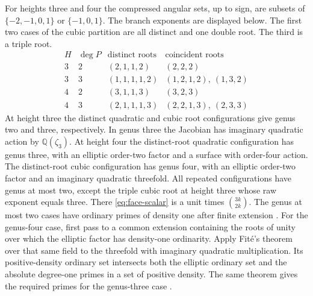 For heights three and four the compressed angular sets, up to sign, are
subsets of \(\{-2,-1,0,1\}\) or \(\{-1,0,1\}\). The branch exponents
are displayed below. The first two cases of the cubic partition are
all distinct and one double root. The third is a triple root.
\[
\begin{array}{c|c|c|c}
H & \deg P & \text{distinct roots} & \text{coincident roots}\\ \hline
3 & 2 &(2,1,1,2)&(2,2,2)\\
3 & 3 &(1,1,1,1,2)&(1,2,1,2),\ (1,3,2)\\
4 & 2 &(3,1,1,3)&(3,2,3)\\
4 & 3 &(2,1,1,1,3)&(2,2,1,3),\ (2,3,3)
\end{array}
\]
At height three the distinct quadratic and cubic root configurations
give genus two and three, respectively. In genus three the Jacobian has imaginary quadratic action
by \(\mathbb Q(\zeta_3)\). At height four the distinct-root quadratic
configuration has genus three, with an elliptic order-two factor and a
surface with order-four action. The distinct-root cubic configuration
has genus four, with an elliptic order-two factor and an imaginary
quadratic threefold. All repeated configurations have genus at most two,
except the triple cubic root at height three whose raw exponent equals
three. There \eqref{eq:face-scalar} is a unit times \(\binom{3k}{2k}\).
The genus at most two cases have ordinary primes of density one after
finite extension \cite{sawin}. For the genus-four case, first pass to a
common extension containing the roots of unity over which the elliptic
factor has density-one ordinarity. Apply Fit\'e's theorem over that same
field to the threefold with imaginary quadratic multiplication.
Its positive-density ordinary set intersects both the elliptic ordinary
set and the absolute degree-one primes in a set of positive density.
The same theorem gives the required primes for the genus-three case
\cite[Theorem~1]{fite}.

